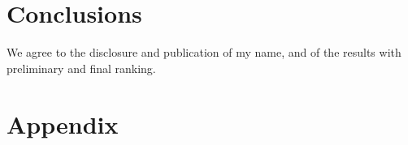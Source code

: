 \section{Conclusions}

We agree to the disclosure and publication of my name, and of the results with preliminary and final ranking.

\section{Appendix}


